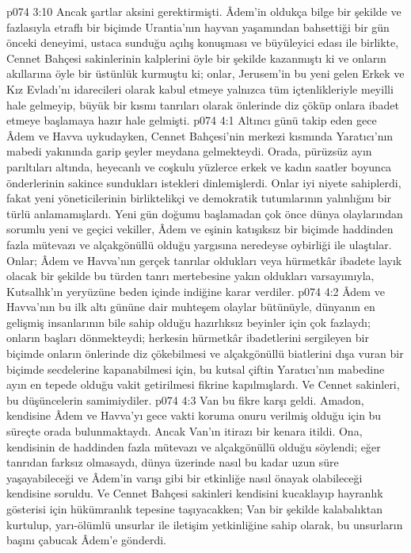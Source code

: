 \vs p074 3:10 Ancak şartlar aksini gerektirmişti. Âdem’in oldukça bilge bir şekilde ve fazlasıyla etraflı bir biçimde Urantia’nın hayvan yaşamından bahsettiği bir gün önceki deneyimi, ustaca sunduğu açılış konuşması ve büyüleyici edası ile birlikte, Cennet Bahçesi sakinlerinin kalplerini öyle bir şekilde kazanmıştı ki ve onların akıllarına öyle bir üstünlük kurmuştu ki; onlar, Jerusem’in bu yeni gelen Erkek ve Kız Evladı’nı idarecileri olarak kabul etmeye yalnızca tüm içtenlikleriyle meyilli hale gelmeyip, büyük bir kısmı tanrıları olarak önlerinde diz çöküp onlara ibadet etmeye başlamaya hazır hale gelmişti.
\vs p074 4:1 Altıncı günü takip eden gece Âdem ve Havva uykudayken, Cennet Bahçesi’nin merkezi kısmında Yaratıcı’nın mabedi yakınında garip şeyler meydana gelmekteydi. Orada, pürüzsüz ayın parıltıları altında, heyecanlı ve coşkulu yüzlerce erkek ve kadın saatler boyunca önderlerinin sakince sundukları istekleri dinlemişlerdi. Onlar iyi niyete sahiplerdi, fakat yeni yöneticilerinin birliktelikçi ve demokratik tutumlarının yalınlığını bir türlü anlamamışlardı. Yeni gün doğumu başlamadan çok önce dünya olaylarından sorumlu yeni ve geçici vekiller, Âdem ve eşinin katışıksız bir biçimde haddinden fazla mütevazı ve alçakgönüllü olduğu yargısına neredeyse oybirliği ile ulaştılar. Onlar; Âdem ve Havva’nın gerçek tanrılar oldukları veya hürmetkâr ibadete layık olacak bir şekilde bu türden tanrı mertebesine yakın oldukları varsayımıyla, Kutsallık’ın yeryüzüne beden içinde indiğine karar verdiler.
\vs p074 4:2 Âdem ve Havva’nın bu ilk altı gününe dair muhteşem olaylar bütünüyle, dünyanın en gelişmiş insanlarının bile sahip olduğu hazırlıksız beyinler için çok fazlaydı; onların başları dönmekteydi; herkesin hürmetkâr ibadetlerini sergileyen bir biçimde onların önlerinde diz çökebilmesi ve alçakgönüllü biatlerini dışa vuran bir biçimde secdelerine kapanabilmesi için, bu kutsal çiftin Yaratıcı’nın mabedine ayın en tepede olduğu vakit getirilmesi fikrine kapılmışlardı. Ve Cennet sakinleri, bu düşüncelerin samimiydiler.
\vs p074 4:3 Van bu fikre karşı geldi. Amadon, kendisine Âdem ve Havva’yı gece vakti koruma onuru verilmiş olduğu için bu süreçte orada bulunmaktaydı. Ancak Van’ın itirazı bir kenara itildi. Ona, kendisinin de haddinden fazla mütevazı ve alçakgönüllü olduğu söylendi; eğer tanrıdan farksız olmasaydı, dünya üzerinde nasıl bu kadar uzun süre yaşayabileceği ve Âdem’in varışı gibi bir etkinliğe nasıl önayak olabileceği kendisine soruldu. Ve Cennet Bahçesi sakinleri kendisini kucaklayıp hayranlık gösterisi için hükümranlık tepesine taşıyacakken; Van bir şekilde kalabalıktan kurtulup, yarı\hyp{}ölümlü unsurlar ile iletişim yetkinliğine sahip olarak, bu unsurların başını çabucak Âdem’e gönderdi.
